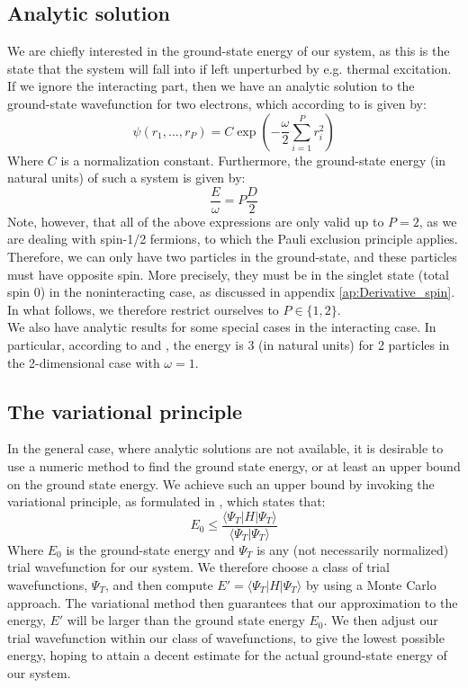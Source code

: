 \documentclass[a4paper, 10pt]{article}
\begin{document}
	\subsection{Analytic solution}
	We are chiefly interested in the ground-state energy of our system, as this is the state that the system will fall into if left unperturbed by e.g. thermal excitation. If we ignore the interacting part, then we have an analytic solution to the ground-state wavefunction for two electrons, which according to \cite{Griffiths2004} is given by:
	\begin{equation}
	\psi(r_1,...,r_P)=C\exp\left(-\frac{\omega}{2}\sum_{i=1}^P r_i^2\right)
	\end{equation}
	Where $C$ is a normalization constant. Furthermore, the ground-state energy (in natural units) of such a system is given by:
	\begin{equation}\label{eq:Ground-state-energy}
	\frac{E}{\omega}=P\frac{D}{2}
	\end{equation}
	Note, however, that all of the above expressions are only valid up to $P=2$, as we are dealing with spin-1/2 fermions, to which the Pauli exclusion principle applies. Therefore, we can only have two particles in the ground-state, and these particles must have opposite spin. More precisely, they must be in the singlet state (total spin $0$) in the noninteracting case, as discussed in appendix \ref{ap:Derivative_spin}. In what follows, we therefore restrict ourselves to $P\in \{1,2\}$.\\
	\linebreak
	We also have analytic results for some special cases in the interacting case. In particular, according to \cite{0305-4470-27-3-040} and \cite{PhysRevB.84.115302}, the energy is $3$ (in natural units) for 2 particles in the 2-dimensional case with $\omega=1$.
	\subsection{The variational principle}
	 In the general case, where analytic solutions are not available, it is desirable to use a numeric method to find the ground state energy, or at least an upper bound on the ground state energy. We achieve such an upper bound by invoking the variational principle, as formulated in \cite{Griffiths2004}, which states that:
	\begin{equation}\label{eq:Variational_Principle}
	E_0\leq \frac{\langle \Psi_T | H |\Psi_T \rangle}{\langle \Psi_T | \Psi_T \rangle}
	\end{equation} 
	Where $E_0$ is the ground-state energy and $\Psi_T$ is any (not necessarily normalized) trial wavefunction for our system. We therefore choose a class of trial wavefunctions, $\Psi_T$, and then compute $E'=\langle \Psi_T | H |\Psi_T\rangle$ by using a Monte Carlo approach. The variational method then guarantees that our approximation to the energy, $E'$ will be larger than the ground state energy $E_0$. We then adjust our trial wavefunction within our class of wavefunctions, to give the lowest possible energy, hoping to attain a decent estimate for the actual ground-state energy of our system. 
\end{document}
